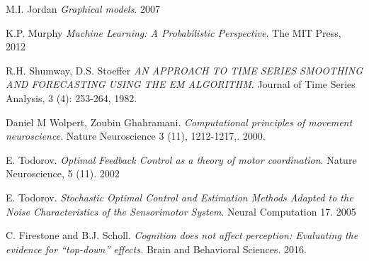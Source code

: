 \documentclass[11pt, reqno]{article}
\numberwithin{equation}{section}
\begin{document}
\begin{thebibliography}{9}

M.I. Jordan
\textit{Graphical models}. 
2007

K.P. Murphy
\textit{Machine Learning: A Probabilistic Perspective}. 
The MIT Press, 2012

R.H. Shumway, D.S. Stoeffer 
\textit{AN APPROACH TO TIME SERIES SMOOTHING AND FORECASTING USING THE EM ALGORITHM}. 
Journal of Time Series Analysis, 3 (4): 253-264, 1982.

Daniel M Wolpert, Zoubin Ghahramani. 
\textit{Computational principles of movement neuroscience}.  Nature Neuroscience 3 (11), 1212-1217,. 2000. 

E. Todorov.  \textit{Optimal Feedback Control as a theory of motor coordination}. Nature Neuroscience, 5 (11).  2002

E. Todorov. \textit{Stochastic Optimal Control and Estimation Methods Adapted to the Noise Characteristics of the Sensorimotor System}. Neural Computation 17. 2005

C. Firestone and B.J. Scholl. 
\textit{Cognition does not affect perception: Evaluating the evidence for “top-down” effects.} Brain and
Behavioral Sciences.  2016.


\end{thebibliography}
\end{document}
